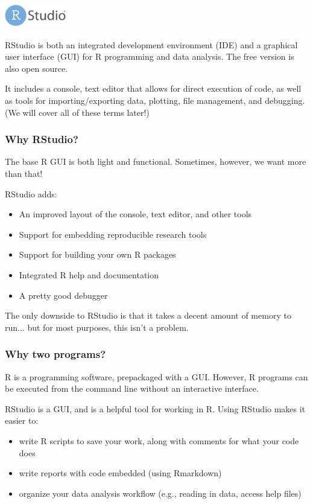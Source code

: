 \documentclass[11pt]{beamer}
\newcommand{\myframe}[1]{\begin{frame} \frametitle{#1}}
\newenvironment{spaceitemize}
{ \begin{itemize}
    \setlength{\itemsep}{10pt}
    \setlength{\parskip}{0pt}
    \setlength{\parsep}{0pt}     }
{ \end{itemize}                  }
\begin{document}
\myframe{\includegraphics[width = 0.2\textwidth]{figs/RStudiologo.png}}
RStudio is both an integrated development environment (IDE) and a graphical user interface (GUI) for R programming and data analysis. The free version is also open source. \pause

It includes a console, text editor that allows for direct execution of code, as well as tools for importing/exporting data, plotting, file management, and debugging. (We will cover all of these terms later!)
\end{frame}

\myframe{Why RStudio?}
The base R GUI is both light and functional. Sometimes, however, we want more than that!

RStudio adds: \pause
\begin{spaceitemize}
\item An improved layout of the console, text editor, and other tools \pause
\item Support for embedding reproducible research tools \pause
\item Support for building your own R packages \pause
\item Integrated R help and documentation \pause
\item A pretty good debugger \pause
\end{spaceitemize}

The only downside to RStudio is that it takes a decent amount of memory to run... but for most purposes, this isn't a problem. 
\end{frame}


\myframe{Why two programs?}
R is a programming software, prepackaged with a GUI. However, R programs can be executed from the command line without an interactive interface. \pause

RStudio is a GUI, and is a helpful tool for working in R. Using RStudio makes it easier to: \pause
\begin{spaceitemize}
\item write R scripts to save your work, along with comments for what your code does \pause
\item write reports with code embedded (using Rmarkdown) \pause
\item organize your data analysis workflow (e.g., reading in data, access help files)
\end{spaceitemize}
\end{frame}
\end{document}
